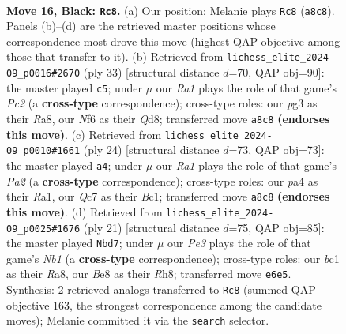 \documentclass[11pt]{article}
\begin{document}
\begin{figure}[p]\centering
\begin{subfigure}{0.46\textwidth}\centering
\resizebox{\linewidth}{!}{%
\newchessgame
\chessboard[
  setfen={r3b1k1/p1qrbpp1/npp1pn2/7p/P1NP1P2/1PN3P1/4P1BP/R1BQR1K1 b - - 3 16},
  showmover=false,
  pgfstyle=straightmove, color=movearrow, markmove={a8-c8}
]}
\caption{}
\end{subfigure}\hfill
\begin{subfigure}{0.46\textwidth}\centering
\resizebox{\linewidth}{!}{%
\newchessgame
\chessboard[
  setfen={r2qrbk1/1bp2p2/p2p1npp/1p6/2nNP3/2P2PN1/PPB3PP/R1BQR1K1 b - - 2 17},
  showmover=false,
  pgfstyle=straightmove, color=movearrow, markmove={c7-c5}
]}
\caption{}
\end{subfigure}
\\[4pt]
\begin{subfigure}{0.46\textwidth}\centering
\resizebox{\linewidth}{!}{%
\newchessgame
\chessboard[
  setfen={r1bqr1k1/pp3pb1/2n3pp/2pnp3/8/2PP1N1P/PPN2PP1/R1BQRBK1 w - - 0 13},
  showmover=false,
  pgfstyle=straightmove, color=movearrow, markmove={a2-a4}
]}
\caption{}
\end{subfigure}\hfill
\begin{subfigure}{0.46\textwidth}\centering
\resizebox{\linewidth}{!}{%
\newchessgame
\chessboard[
  setfen={rn2k2r/1bq1bppp/pp1ppn2/8/2PNP3/2N3P1/PP2QPBP/R1B1R1K1 b kq - 2 11},
  showmover=false,
  pgfstyle=straightmove, color=movearrow, markmove={b8-d7}
]}
\caption{}
\end{subfigure}
\caption{\textbf{Move 16, Black: \texttt{Rc8}.} (a) Our position; Melanie plays \texttt{Rc8} (\texttt{a8c8}). Panels (b)--(d) are the retrieved master positions whose correspondence most drove this move (highest QAP objective among those that transfer to it). (b) Retrieved from \texttt{lichess\_elite\_2024-09\_p0016\#2670} (ply 33) [structural distance $d$=70, QAP obj=90]: the master played \texttt{c5}; under $\mu$ our \emph{Ra1} plays the role of that game's \emph{Pc2} (a \textbf{cross-type} correspondence); cross-type roles: our \emph{p}g3 as their \emph{R}a8, our \emph{N}f6 as their \emph{Q}d8; transferred move \texttt{a8c8} \textbf{(endorses this move)}. (c) Retrieved from \texttt{lichess\_elite\_2024-09\_p0010\#1661} (ply 24) [structural distance $d$=73, QAP obj=73]: the master played \texttt{a4}; under $\mu$ our \emph{Ra1} plays the role of that game's \emph{Pa2} (a \textbf{cross-type} correspondence); cross-type roles: our \emph{p}a4 as their \emph{R}a1, our \emph{Q}c7 as their \emph{B}c1; transferred move \texttt{a8c8} \textbf{(endorses this move)}. (d) Retrieved from \texttt{lichess\_elite\_2024-09\_p0025\#1676} (ply 21) [structural distance $d$=75, QAP obj=85]: the master played \texttt{Nbd7}; under $\mu$ our \emph{Pe3} plays the role of that game's \emph{Nb1} (a \textbf{cross-type} correspondence); cross-type roles: our \emph{b}c1 as their \emph{R}a8, our \emph{B}e8 as their \emph{R}h8; transferred move \texttt{e6e5}. Synthesis: 2 retrieved analogs transferred to \texttt{Rc8} (summed QAP objective 163, the strongest correspondence among the candidate moves); Melanie committed it via the \texttt{search} selector.}
\label{fig:thought-m31}
\end{figure}
\end{document}
